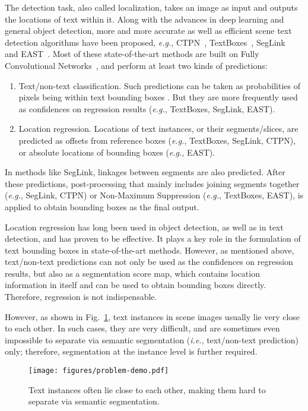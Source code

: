 \documentclass[letterpaper]{article} \usepackage{aaai18}  \usepackage{times}  \usepackage{helvet}  \usepackage{courier}  \usepackage{url}  \usepackage{graphicx}
\begin{document}
	The detection task, also called localization, takes an image as input and outputs the locations of text within it. Along with the advances in deep learning and general object detection, more and more accurate as well as efficient scene text detection algorithms have been proposed, \emph{e.g.}, CTPN~\cite{Tian2016CTPN}, TextBoxes~\cite{Liao2016TextBoxes}, SegLink~\cite{Shi2017SegLink} and EAST~\cite{Zhou2017EAST}.
	Most of these state-of-the-art methods are built on Fully Convolutional Networks~\cite{Long2015FCN}, and perform at least two kinds of predictions:
	\begin{enumerate}
		\item Text/non-text classification. Such predictions can be taken as probabilities of pixels being within text bounding boxes \cite{zhang2016TextBlock}. But they are more frequently used as confidences on regression results (\emph{e.g.}, TextBoxes, SegLink, EAST).
		
		\item Location regression. Locations of text instances, or their segments/slices, are predicted as offsets from reference boxes (\emph{e.g.}, TextBoxes, SegLink, CTPN), or absolute locations of bounding boxes (\emph{e.g.}, EAST).
	\end{enumerate}
	In methods like SegLink, linkages between segments are also predicted.  After these predictions, post-processing that mainly includes joining segments together (\emph{e.g.}, SegLink, CTPN) or Non-Maximum Suppression (\emph{e.g.}, TextBoxes, EAST), is applied to obtain bounding boxes as the final output.
	
	Location regression has long been used in object detection, as well as in text detection, and has proven to be effective. It plays a key role in the formulation of text bounding boxes in state-of-the-art methods. However, as mentioned above, text/non-text predictions can not only be used as the confidences on regression results, but also as a segmentation score map, which contains location information in itself and can be used to obtain bounding boxes directly. Therefore, regression is not indispensable.
	
	However, as shown in Fig.~\ref{figure:problem1}, text instances in scene images usually lie very close to each other. In such cases, they are very difficult, and are sometimes even impossible to separate via semantic segmentation (\emph{i.e.}, text/non-text prediction) only; therefore, segmentation at the instance level is further required.
	
	\begin{figure}
		\centering
		\texttt{[image: figures/problem-demo.pdf]}
		\label{figure:problem1}
		\caption{Text instances often lie close to each other, making them hard to separate via semantic segmentation.}
	\end{figure}
	
\end{document}
